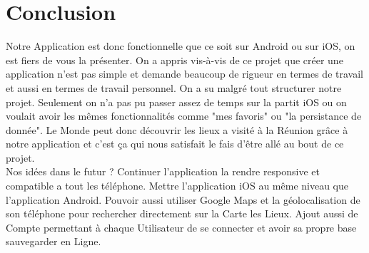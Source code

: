\documentclass{article}
\begin{document}
 



{\color{brown}\section{Conclusion}}
\label{section:conclusion}
Notre Application est donc fonctionnelle que ce soit sur Android ou sur iOS, on est fiers de vous la présenter. On a appris vis-à-vis de ce projet que créer une application n'est pas simple et demande beaucoup de rigueur en termes de travail et aussi en termes de travail personnel. On a su malgré tout structurer notre projet.
Seulement on n’a pas pu passer assez de temps sur la partit iOS ou on voulait avoir les mêmes fonctionnalités comme "mes favoris" ou "la persistance de donnée".
Le Monde peut donc découvrir les lieux a visité à la Réunion grâce à notre application et c'est ça qui nous satisfait le fais d'être allé au bout de ce projet.
\\
Nos idées dans le futur ? 
Continuer l'application la rendre responsive et compatible a tout les téléphone. Mettre l'application iOS au même niveau que l'application Android. Pouvoir aussi utiliser Google Maps et la géolocalisation de son téléphone pour rechercher directement sur la Carte les Lieux.
Ajout aussi de Compte permettant à chaque Utilisateur de se connecter et avoir sa propre base sauvegarder en Ligne.
\end{document}

